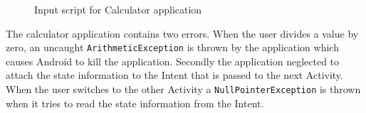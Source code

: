 \documentclass{acm_proc_article-sp}
\begin{document}
\begin{figure}

\vspace{-15pt}
\caption{Input script for Calculator application}
\label{fig:calc}
\end{figure}

The calculator application contains two errors. When the user divides a value by zero, an uncaught
\texttt{ArithmeticException} is thrown by the application which causes Android to kill the application. Secondly the application neglected
to attach the state information to the Intent that is passed to the next Activity. When the user switches to the other Activity a
\texttt{NullPointerException} is thrown when it tries to read the state information from the Intent. 
\end{document}
